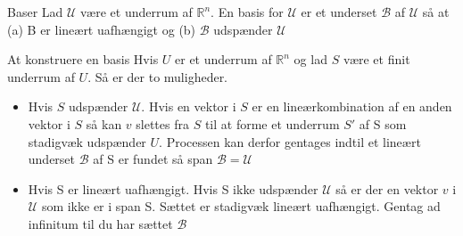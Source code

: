 \documentclass[a4paper,fleqn]{article}
\newcommand{\RR}{\mathbb{R}}
\newcommand{\U}{\mathcal{U}}
\newcommand{\B}{\mathcal{B}}
\begin{document}
	\begin{definition}{Baser}{}
		Lad $\U$ være et underrum af $\RR^n$. En basis for $\U$ er et underset $\B$ af $\U$
		så at (a) B er lineært uafhængigt og (b) $\B$ udspænder $\U$
	\end{definition}
	\begin{theorem}{At konstruere en basis}{}
		Hvis $U$ er et underrum af $\RR^n$ og lad $S$ være et finit underrum af $U$. Så er
		der to muligheder.
		\begin{itemize}
			\item Hvis $S$ udspænder $\U$. Hvis en vektor i $S$ er en lineærkombination af en
				anden vektor i $S$ så kan $v$ slettes fra $S$ til at forme et underrum $S'$
				af S som stadigvæk udspænder $U$. Processen kan derfor gentages indtil et
				lineært underset $\B$ af S er fundet så span $\B = \U$
			\item Hvis S er lineært uafhængigt. Hvis S ikke udspænder $\U$ så er der en vektor
				$v$ i $\U$ som ikke er i span S. Sættet er stadigvæk lineært uafhængigt.
				Gentag ad infinitum til du har sættet $\B$
		\end{itemize}
	\end{theorem}
\end{document}
